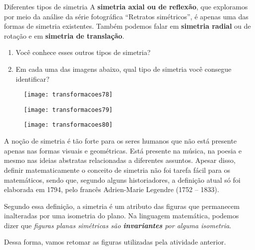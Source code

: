 \begin{task}{Diferentes tipos de simetria}
A \textbf{simetria axial ou de reflexão}, que exploramos por meio da análise da série fotográfica “Retratos simétricos”, é apenas uma das formas de simetria existentes. Também podemos falar em \textbf{simetria radial} ou de rotação e em \textbf{simetria de translação}. 

\begin{enumerate}
\item Você conhece esses outros tipos de simetria? 
\item Em cada uma das imagens abaixo, qual tipo de simetria você consegue identificar?
\end{enumerate}

\begin{figure}[H]
\centering

\texttt{[image: transformacoes78]}
\end{figure}

\begin{figure}[H]
\centering

\texttt{[image: transformacoes79]}
\end{figure}

\begin{figure}[H]
\centering

\texttt{[image: transformacoes80]}
\end{figure}
\end{task}


A noção de simetria é tão forte para os seres humanos que não está presente apenas nas formas visuais e geométricas. Está presente na música, na poesia e mesmo nas ideias abstratas relacionadas a diferentes assuntos. Apesar disso, definir matematicamente o conceito de simetria não foi tarefa fácil para os matemáticos, sendo que, segundo alguns historiadores, a definição atual só foi elaborada em 1794, pelo francês Adrien-Marie Legendre (1752 – 1833).

Segundo essa definição, a simetria é um atributo das figuras que permanecem inalteradas por uma isometria do plano. Na linguagem matemática, podemos dizer que \textit{figuras planas simétricas são \textbf{invariantes} por alguma isometria}. 

Dessa forma, vamos retomar as figuras utilizadas pela atividade anterior.


